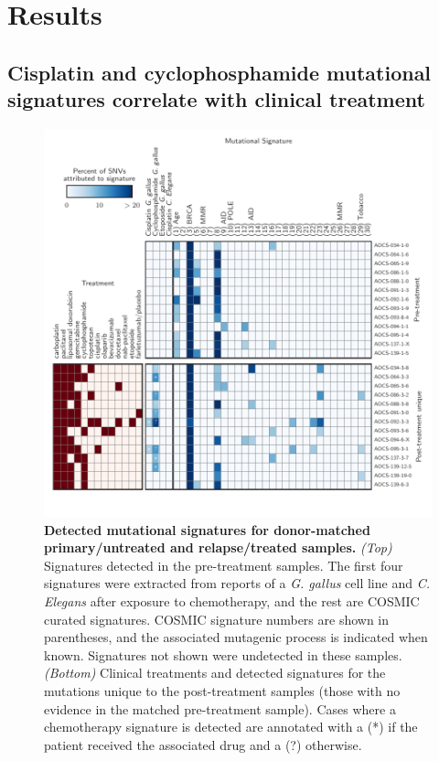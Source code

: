 \section*{Results}

\subsection*{Cisplatin and cyclophosphamide mutational signatures correlate with clinical treatment}

\begin{figure}[htbp]
\centering
\includegraphics[scale=1.0]{figures/signatures.pdf}
\caption{\textbf{Detected mutational signatures for donor-matched primary/untreated and relapse/treated samples.} \textit{(Top)} Signatures detected in the pre-treatment samples. The first four signatures were extracted from reports of a \textit{G. gallus} cell line and \textit{C. Elegans} after exposure to chemotherapy, and the rest are COSMIC curated signatures. COSMIC signature numbers are shown in parentheses, and the associated mutagenic process is indicated when known. Signatures not shown were undetected in these samples. \textit{(Bottom)} Clinical treatments and detected signatures for the mutations unique to the post-treatment samples (those with no evidence in the matched pre-treatment sample). Cases where a chemotherapy signature is detected are annotated with a (*) if the patient received the associated drug and a (?) otherwise.}
\label{fig:signatures}
\end{figure}

